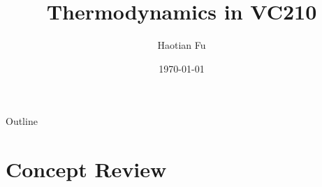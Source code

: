 \documentclass[12pt,compress]{beamer}
\title{Thermodynamics in VC210}
\author{Haotian Fu}
\institute{University of Michigan--Shanghai Jiao Tong University Joint Institute}
\date{\today}
\begin{document}


\frame{\titlepage}

\section[Outline]{}
\begin{frame}{Outline}
    \tableofcontents
\end{frame}


\section{Concept Review}
\end{document}
